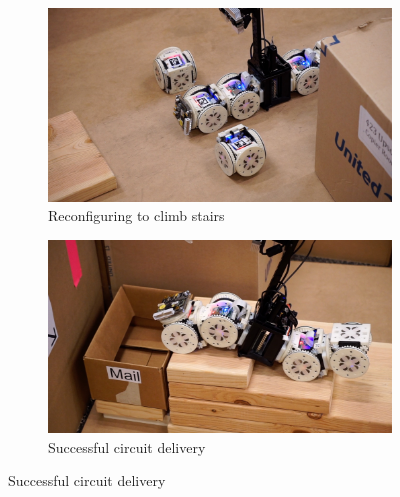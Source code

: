 \documentclass[journal]{IEEEtran}
\begin{document}
\begin{figure}[t]
      \centering
      \begin{subfigure}[t]{0.24\textwidth}
        \includegraphics[width=\textwidth]{images/stairs_reconfig.jpg}
        \caption{Reconfiguring to climb stairs}
    \end{subfigure}
    \begin{subfigure}[t]{0.24\textwidth}
        \includegraphics[width=\textwidth]{images/stairs_climb.jpg}
        \caption{Successful circuit delivery}
    \end{subfigure}
    

\end{figure}
\end{document}
